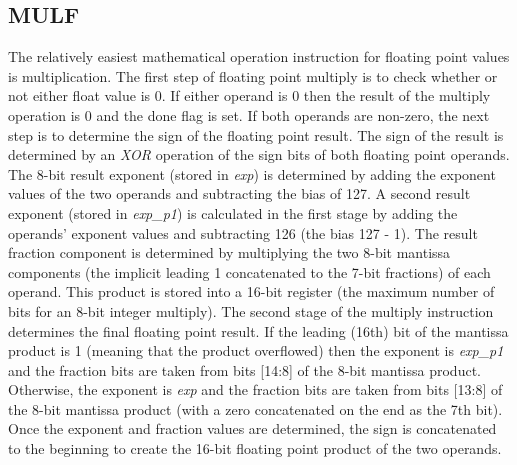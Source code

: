\documentclass[conference]{IEEEtran}
\begin{document}
    \subsection{MULF}
    The relatively easiest mathematical operation instruction for floating point values is multiplication. The first step of floating point multiply is to check whether or not either float value is 0. If either operand is 0 then the result of the multiply operation is 0 and the done flag is set. If both operands are non-zero, the next step is to determine the sign of the floating point result. The sign of the result is determined by an \textit{XOR} operation of the sign bits of both floating point operands. The 8-bit result exponent (stored in \textit{exp}) is determined by adding the exponent values of the two operands and subtracting the bias of 127. A second result exponent (stored in \textit{exp_p1}) is calculated in the first stage by adding the operands' exponent values and subtracting 126 (the bias 127 - 1). The result fraction component is determined by multiplying the two 8-bit mantissa components (the implicit leading 1 concatenated to the 7-bit fractions) of each operand. This product is stored into a 16-bit register (the maximum number of bits for an 8-bit integer multiply). The second stage of the multiply instruction determines the final floating point result. If the leading (16th) bit of the mantissa product is 1 (meaning that the product overflowed) then the exponent is \textit{exp_p1} and the fraction bits are taken from bits [14:8] of the 8-bit mantissa product. Otherwise, the exponent is \textit{exp} and the fraction bits are taken from bits [13:8] of the 8-bit mantissa product (with a zero concatenated on the end as the 7th bit). Once the exponent and fraction values are determined, the sign is concatenated to the beginning to create the 16-bit floating point product of the two operands.
\end{document}

